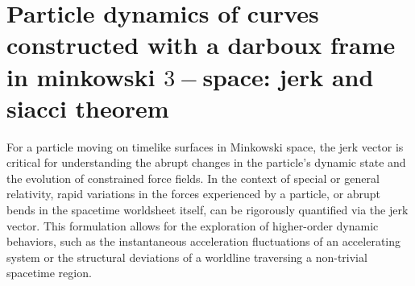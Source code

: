 \documentclass[reqno]{amsart}
\theoremstyle{plain}
\newtheorem{case}{Case}
\numberwithin{equation}{section}
\begin{document}

\section{Particle dynamics of curves constructed with a darboux frame in minkowski $3-$space: jerk and siacci theorem}

For a particle moving on timelike surfaces in Minkowski space, the jerk vector is critical for understanding the abrupt changes in the particle's dynamic state and the evolution of constrained force fields. In the context of special or general relativity, rapid variations in the forces experienced by a particle, or abrupt bends in the spacetime worldsheet itself, can be rigorously quantified via the jerk vector. This formulation allows for the exploration of higher-order dynamic behaviors, such as the instantaneous acceleration fluctuations of an accelerating system or the structural deviations of a worldline traversing a non-trivial spacetime region.
\end{document}
